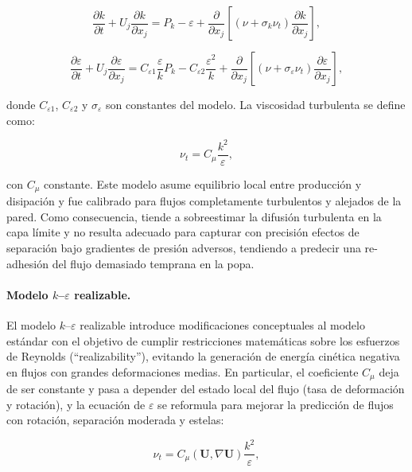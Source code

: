 \begin{equation}
\frac{\partial k}{\partial t} + U_j \frac{\partial k}{\partial x_j}
=
P_k - \varepsilon
+ \frac{\partial}{\partial x_j}
\left[
(\nu + \sigma_k \nu_t)\frac{\partial k}{\partial x_j}
\right],
\end{equation}

\begin{equation}
\frac{\partial \varepsilon}{\partial t} + U_j \frac{\partial \varepsilon}{\partial x_j}
=
C_{\varepsilon 1} \frac{\varepsilon}{k} P_k
- C_{\varepsilon 2} \frac{\varepsilon^2}{k}
+ \frac{\partial}{\partial x_j}
\left[
(\nu + \sigma_\varepsilon \nu_t)\frac{\partial \varepsilon}{\partial x_j}
\right],
\end{equation}

donde $C_{\varepsilon 1}$, $C_{\varepsilon 2}$ y $\sigma_\varepsilon$ son 
constantes del modelo. La viscosidad turbulenta se define como:

\begin{equation}
\nu_t = C_\mu \frac{k^2}{\varepsilon},
\end{equation}

con $C_\mu$ constante. Este modelo asume equilibrio local entre producción y 
disipación y fue calibrado para flujos completamente turbulentos y alejados 
de la pared. Como consecuencia, tiende a sobreestimar la difusión turbulenta 
en la capa límite y no resulta adecuado para capturar con precisión efectos 
de separación bajo gradientes de presión adversos, tendiendo a predecir una 
re-adhesión del flujo demasiado temprana en la popa.

\paragraph{Modelo $k$--$\varepsilon$ realizable.}

El modelo $k$--$\varepsilon$ realizable \citep{Shih1994} introduce 
modificaciones conceptuales al modelo estándar con el objetivo de cumplir 
restricciones matemáticas sobre los esfuerzos de Reynolds 
(``realizability''), evitando la generación de energía cinética negativa 
en flujos con grandes deformaciones medias. En particular, el coeficiente 
$C_\mu$ deja de ser constante y pasa a depender del estado local del flujo 
(tasa de deformación y rotación), y la ecuación de $\varepsilon$ se 
reformula para mejorar la predicción de flujos con rotación, separación 
moderada y estelas:

\begin{equation}
\nu_t = C_\mu(\mathbf{U}, \nabla \mathbf{U}) \frac{k^2}{\varepsilon},
\end{equation}

